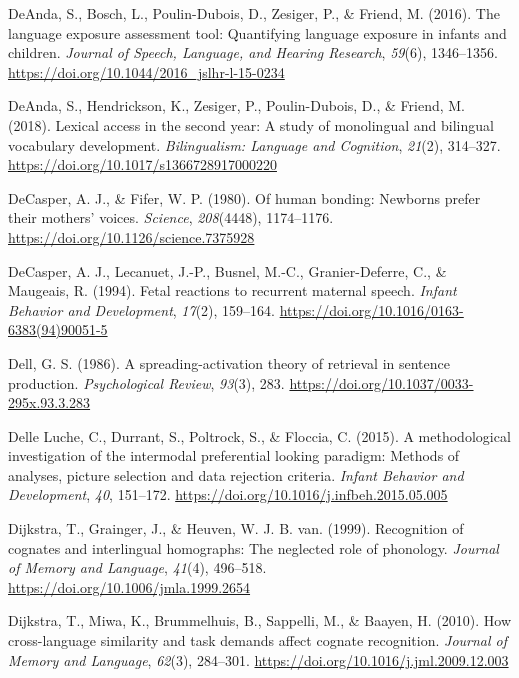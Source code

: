 \documentclass[
  12pt,
  b5paperpaper,
  twoside]{scrreprt}
\newlength{\cslhangindent}
\newlength{\cslentryspacingunit} %
\newenvironment{CSLReferences}[2] %
 {%
  \setlength{\parindent}{0pt}
  \ifodd #1
  \let\oldpar\par
  \def\par{\hangindent=\cslhangindent\oldpar}
  \fi
  \setlength{\parskip}{#2\cslentryspacingunit}
 }%
 {}
\begin{document}
\begin{CSLReferences}{1}{0}
\leavevmode{}%
DeAnda, S., Bosch, L., Poulin-Dubois, D., Zesiger, P., \& Friend, M.
(2016). The language exposure assessment tool: Quantifying language
exposure in infants and children. \emph{Journal of Speech, Language, and
Hearing Research}, \emph{59}(6), 1346--1356.
\url{https://doi.org/10.1044/2016_jslhr-l-15-0234}

\leavevmode{}%
DeAnda, S., Hendrickson, K., Zesiger, P., Poulin-Dubois, D., \& Friend,
M. (2018). Lexical access in the second year: A study of monolingual and
bilingual vocabulary development. \emph{Bilingualism: Language and
Cognition}, \emph{21}(2), 314--327.
\url{https://doi.org/10.1017/s1366728917000220}

\leavevmode{}%
DeCasper, A. J., \& Fifer, W. P. (1980). Of human bonding: Newborns
prefer their mothers' voices. \emph{Science}, \emph{208}(4448),
1174--1176. \url{https://doi.org/10.1126/science.7375928}

\leavevmode{}%
DeCasper, A. J., Lecanuet, J.-P., Busnel, M.-C., Granier-Deferre, C., \&
Maugeais, R. (1994). Fetal reactions to recurrent maternal speech.
\emph{Infant Behavior and Development}, \emph{17}(2), 159--164.
\url{https://doi.org/10.1016/0163-6383(94)90051-5}

\leavevmode{}%
Dell, G. S. (1986). A spreading-activation theory of retrieval in
sentence production. \emph{Psychological Review}, \emph{93}(3), 283.
\url{https://doi.org/10.1037/0033-295x.93.3.283}

\leavevmode{}%
Delle Luche, C., Durrant, S., Poltrock, S., \& Floccia, C. (2015). A
methodological investigation of the intermodal preferential looking
paradigm: Methods of analyses, picture selection and data rejection
criteria. \emph{Infant Behavior and Development}, \emph{40}, 151--172.
\url{https://doi.org/10.1016/j.infbeh.2015.05.005}

\leavevmode{}%
Dijkstra, T., Grainger, J., \& Heuven, W. J. B. van. (1999). Recognition
of cognates and interlingual homographs: The neglected role of
phonology. \emph{Journal of Memory and Language}, \emph{41}(4),
496--518. \url{https://doi.org/10.1006/jmla.1999.2654}

\leavevmode{}%
Dijkstra, T., Miwa, K., Brummelhuis, B., Sappelli, M., \& Baayen, H.
(2010). How cross-language similarity and task demands affect cognate
recognition. \emph{Journal of Memory and Language}, \emph{62}(3),
284--301. \url{https://doi.org/10.1016/j.jml.2009.12.003}


\end{CSLReferences}
\end{document}
